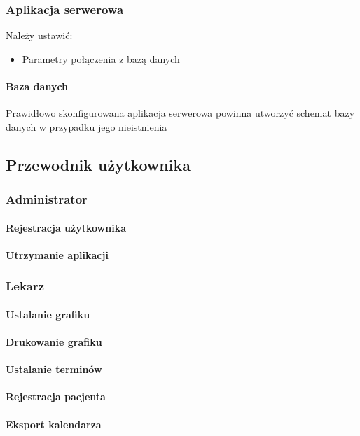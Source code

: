 \documentclass[polish,12pt]{aghthesis}
\begin{document}
\subsubsection{Aplikacja serwerowa}{Należy ustawić:
\begin{itemize}
    \item Parametry połączenia z bazą danych
\end{itemize}}
\paragraph{Baza danych}{Prawidłowo skonfigurowana aplikacja serwerowa powinna utworzyć schemat bazy danych w przypadku jego nieistnienia}


\subsection{Przewodnik użytkownika}
\subsubsection{Administrator}
\paragraph{Rejestracja użytkownika}{}
\paragraph{Utrzymanie aplikacji}{}
\subsubsection{Lekarz}
\paragraph{Ustalanie grafiku}{}
\paragraph{Drukowanie grafiku}{}
\paragraph{Ustalanie terminów}{}
\paragraph{Rejestracja pacjenta}{}
\paragraph{Eksport kalendarza}{}
\end{document}
